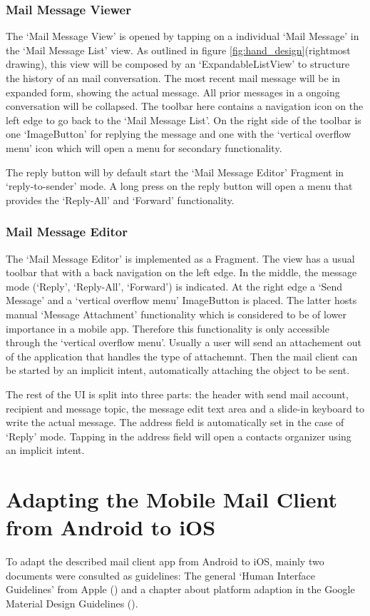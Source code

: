 \documentclass[a4paper,11pt,twoside]{article}
\begin{document}
\subsubsection{Mail Message Viewer}
The `Mail Message View' is opened by tapping on a individual `Mail Message' in
the `Mail Message List' view. As outlined in figure
\ref{fig:hand_design}(rightmost drawing), this view will be composed by an
`ExpandableListView' to structure the history of an mail conversation. The most
recent mail message will be in expanded form, showing the actual message. All
prior messages in a ongoing conversation will be collapsed. The toolbar here
contains a navigation icon on the left edge to go back to the `Mail Message
List'. On the right side of the toolbar is one `ImageButton' for replying the
message and one with the `vertical overflow menu' icon which will open a menu
for secondary functionality.

The reply button will by default start the `Mail Message Editor' Fragment in
`reply-to-sender' mode. A long press on the reply button will open a menu that
provides the `Reply-All' and `Forward' functionality.


\subsubsection{Mail Message Editor}
The `Mail Message Editor' is implemented as a Fragment. The view has a usual
toolbar that with a back navigation on the left edge. In the middle, the message
mode (`Reply', `Reply-All', `Forward') is indicated. At the right edge a `Send
Message' and a `vertical overflow menu' ImageButton is placed. The latter hosts
manual `Message Attachment' functionality which is considered to be of lower importance
in a mobile app. Therefore this functionality is only accessible through the
`vertical overflow menu'. Usually a user will send an attachement out of the
application that handles the type of attachemnt. Then the mail client can be
started by an implicit intent, automatically attaching the object to be sent.

The rest of the UI is split  into three parts: the  header with send mail
account, recipient and message topic, the message edit text area and a slide-in
keyboard to write the actual message. The address field is automatically set
in the case of `Reply' mode. Tapping in the address field will open a contacts
organizer using an implicit intent.

\section{Adapting the Mobile Mail Client from Android to iOS}
To adapt the described mail client app from Android to iOS, mainly two documents
were consulted as guidelines: The general `Human Interface Guidelines' from
Apple (\cite{apple_ios_design}) and a chapter about platform adaption in the
Google Material Design Guidelines (\cite{adapt_ios}).



\end{document}
